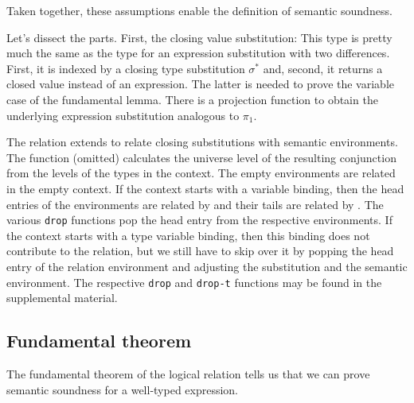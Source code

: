 \documentclass[sigplan,anonymous,review,screen]{acmart}
\begin{document}
Taken together, these assumptions enable the definition of semantic soundness.
\FundamentalSemanticSoundness

Let's dissect the parts. First, the closing value substitution:
\LogicalCSub
This type is pretty much the same as the type for an expression
substitution with two differences. First, it is indexed by a closing
type substitution $\sigma^*$ and, second, it returns a closed value instead of an
expression. The latter is needed to prove the variable case of the
fundamental lemma. There is a projection function to obtain the
underlying expression substitution analogous to $\pi_1$.
\LogicalESSC

The relation {\AGSem} extends {\AVSem} to relate closing substitutions
with semantic environments. The {\AlevelEnv} function (omitted) calculates the universe level
of the resulting conjunction from the levels of the types in the
context.
\LogicalMCG
The empty environments are related in the empty context.
If the context starts with a variable binding, then the head entries of
the environments are related by {\AVSem} and their tails are
related by {\AGSem}.
The various \texttt{drop} functions pop the head entry from the
respective environments.
If the context starts with a type variable binding, then this binding
does not contribute to the relation, but we still have to skip over it
by popping the head entry of the relation environment and adjusting the
substitution and the semantic environment.
The respective \texttt{drop} and \texttt{drop-t} functions may be
found in the supplemental material.

\subsection{Fundamental theorem}
\label{sec:fundamental}

The fundamental theorem of the logical relation tells us that we can
prove semantic soundness for a well-typed expression.
\FundamentalFundamentalType
\end{document}
